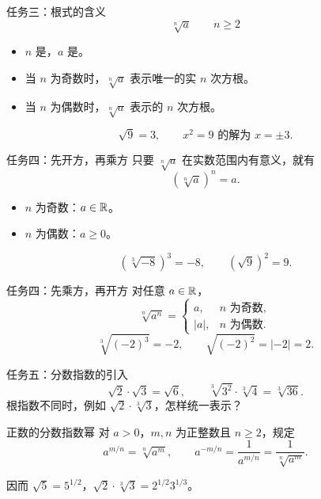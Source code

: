 \documentclass[aspectratio=169,10pt]{beamer}
\begin{document}
\begin{frame}[t]{任务三：根式的含义}
 \[\boxed{\sqrt[n]{a}}\qquad n\ge2\]
 \begin{itemize}
  \item $n$ 是，$a$ 是。
  \item 当 $n$ 为奇数时，$\sqrt[n]a$ 表示唯一的实 $n$ 次方根。
  \item 当 $n$ 为偶数时，$\sqrt[n]a$ 表示的 $n$ 次方根。
 \end{itemize}
 \pause
 \[\sqrt9=3,\qquad x^2=9\text{ 的解为 }x=\pm3.\]
\end{frame}

\begin{frame}[t]{任务四：先开方，再乘方}
 只要 $\sqrt[n]a$ 在实数范围内有意义，就有
 \[\boxed{\left(\sqrt[n]a\right)^n=a}.\]
 \pause
 \begin{itemize}
  \item $n$ 为奇数：$a\in\mathbb R$。
  \item $n$ 为偶数：$a\ge0$。
 \end{itemize}
 \gap
 \[\left(\sqrt[3]{-8}\right)^3=-8,\qquad (\sqrt9)^2=9.\]
\end{frame}

\begin{frame}[t]{任务四：先乘方，再开方}
 对任意 $a\in\mathbb R$，
 \[\boxed{\sqrt[n]{a^n}=\begin{cases}a,&n\text{ 为奇数},\\ |a|,&n\text{ 为偶数}.\end{cases}}\]
 \pause
 \[\sqrt[3]{(-2)^3}=-2,\qquad \sqrt{(-2)^2}=|-2|=2.\]
 \gap
\end{frame}

\begin{frame}[t]{任务五：分数指数的引入}
 \[\sqrt2\cdot\sqrt3=\sqrt6,\qquad
   \sqrt[3]{3^2}\cdot\sqrt[3]4=\sqrt[3]{36}.\]
 根指数不同时，例如 $\sqrt2\cdot\sqrt[3]3$，怎样统一表示？
 \pause
 \begin{block}{正数的分数指数幂}
  对 $a>0$，$m,n$ 为正整数且 $n\ge2$，规定
  \[a^{m/n}=\sqrt[n]{a^m},\qquad
    a^{-m/n}=\frac1{a^{m/n}}=\frac1{\sqrt[n]{a^m}}.\]
 \end{block}
 因而 $\sqrt5=5^{1/2}$，$\sqrt2\cdot\sqrt[3]3=2^{1/2}3^{1/3}$。
\end{frame}
\end{document}
